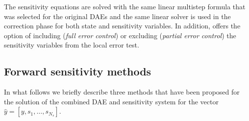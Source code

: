 The sensitivity equations are solved with the same linear multistep formula that
was selected for the original DAEs and the same linear solver is used in the correction
phase for both state and sensitivity variables. In addition, {\idas} offers the option of
including ({\em full error control}) or excluding ({\em partial error control}) the
sensitivity variables from the local error test.

\subsection{Forward sensitivity methods}
In what follows we briefly describe three methods that have been proposed for the
solution of the combined DAE and sensitivity system for the vector
${\hat y} = [y, s_1, \ldots , s_{N_s}]$.

